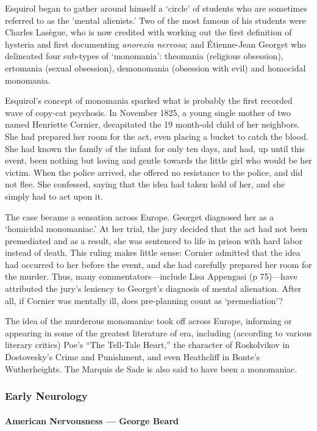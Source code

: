 Esquirol began to gather around himself a `circle' of students who are sometimes referred to as the 'mental alienists.’ Two of the most famous of his students were Charles Lasègue, who is now credited with working out the first definition of hysteria and first documenting \emph{anorexia nervosa}; and Étienne-Jean Georget who delineated four sub-types of `monomania': theomania (religious obsession), ertomania (sexual obsession), demonomania (obsession with evil) and homocidal monomania.

Esquirol's concept of monomania sparked what is probably the first recorded wave of copy-cat psychosis. In November 1825, a young single mother of two named Henriette Cornier, decapitated the 19 month-old child of her neighbors. She had prepared her room for the act, even placing a bucket to catch the blood. She had known the family of the infant for only ten days, and had, up until this event, been nothing but loving and gentle towards the little girl who would be her victim. When the police arrived, she offered no resistance to the police, and did not flee. She confessed, saying that the idea had taken hold of her, and she simply had to act upon it.

The case became a sensation across Europe. Georget diagnosed her as a `homicidal monomaniac.' At her trial, the jury decided that the act had not been premediated and as a result, she was sentenced to life in prison with hard labor instead of death. This ruling makes little sense: Cornier admitted that the idea had occurred to her before the event, and she had carefully prepared her room for the murder. Thus, many commentators---include Lisa Appengasi (p 75)---have attributed the jury’s leniency to Georget's diagnosis of mental alienation. After all, if Cornier was mentally ill, does pre-planning count as `premediation'?

The idea of the murderous monomaniac took off across Europe, informing or appearing in some of the greatest literature of era, including (according to various literary critics) Poe's “The Tell-Tale Heart,” the character of Roskolvikov in Dostovesky's Crime and Punishment, and even Heathcliff in Bonte's Wutherheights. The Marquis de Sade is also said to have been a monomaniac.

\subsubsection{Early Neurology}
\label{earlyneurology}

\paragraph{American Nervousness --- George Beard}
\label{americannervousness---georgebeard}

